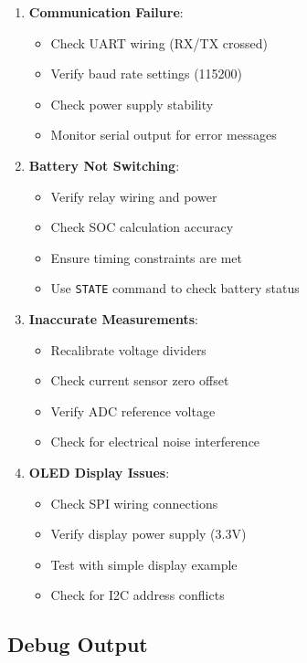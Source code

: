 \documentclass[11pt,a4paper]{article}
\begin{document}
\begin{enumerate}
    \item \textbf{Communication Failure}:
    \begin{itemize}
        \item Check UART wiring (RX/TX crossed)
        \item Verify baud rate settings (115200)
        \item Check power supply stability
        \item Monitor serial output for error messages
    \end{itemize}
    
    \item \textbf{Battery Not Switching}:
    \begin{itemize}
        \item Verify relay wiring and power
        \item Check SOC calculation accuracy
        \item Ensure timing constraints are met
        \item Use \texttt{STATE} command to check battery status
    \end{itemize}
    
    \item \textbf{Inaccurate Measurements}:
    \begin{itemize}
        \item Recalibrate voltage dividers
        \item Check current sensor zero offset
        \item Verify ADC reference voltage
        \item Check for electrical noise interference
    \end{itemize}
    
    \item \textbf{OLED Display Issues}:
    \begin{itemize}
        \item Check SPI wiring connections
        \item Verify display power supply (3.3V)
        \item Test with simple display example
        \item Check for I2C address conflicts
    \end{itemize}
\end{enumerate}

\subsection{Debug Output}
\end{document}

